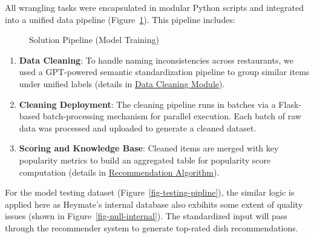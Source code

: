 \documentclass[
  11pt,
  a4paper,
  DIV=11,
  numbers=noendperiod]{scrartcl}
\providecommand{\tightlist}{%
  \setlength{\itemsep}{0pt}\setlength{\parskip}{0pt}}\usepackage{longtable,booktabs,array}
\begin{document}
All wrangling tasks were encapsulated in modular Python scripts and
integrated into a unified data pipeline
(Figure~\ref{fig-training-pipline}). This pipeline includes:

\begin{figure}

\caption{\label{fig-training-pipline}Solution Pipeline (Model Training)}


\end{figure}%

\begin{enumerate}
\def\labelenumi{\arabic{enumi}.}
\tightlist
\item
  \textbf{Data Cleaning}: To handle naming inconsistencies across
  restaurants, we used a GPT-powered semantic standardization pipeline
  to group similar items under unified labels (details in
  \hyperref[data-cleaning-module]{Data Cleaning Module}).
\item
  \textbf{Cleaning Deployment}: The cleaning pipeline runs in batches
  via a Flask-based batch-processing mechanism for parallel execution.
  Each batch of raw data was processed and uploaded to generate a
  cleaned dataset.
\item
  \textbf{Scoring and Knowledge Base}: Cleaned items are merged with key
  popularity metrics to build an aggregated table for popularity score
  computation (details in
  \hyperref[recommendations-algorithm]{Recommendation Algorithm}).
\end{enumerate}

For the model testing dataset (Figure~\ref{fig-testing-pipline}), the
similar logic is applied here as Heymate's internal database also
exbihits some extent of quality issues (shown in
Figure~\ref{fig-null-internal}). The standardized input will pass
through the recommender system to generate top-rated dish
recommendations.
\end{document}
